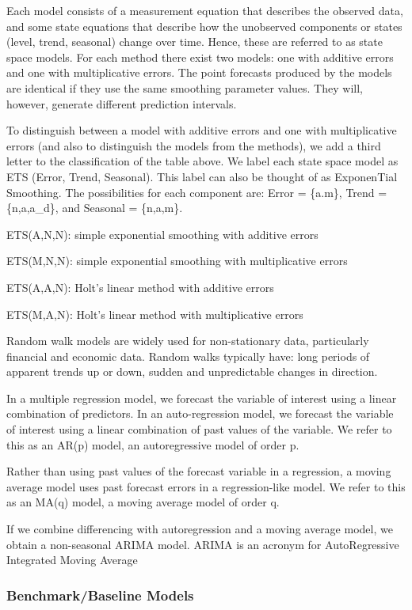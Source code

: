 \documentclass[]{book}
\begin{document}
Each model consists of a measurement equation that describes the observed data, and some state equations that describe how the unobserved components or states (level, trend, seasonal) change over time. Hence, these are referred to as state space models. For each method there exist two models: one with additive errors and one with multiplicative errors. The point forecasts produced by the models are identical if they use the same smoothing parameter values. They will, however, generate different prediction intervals.

To distinguish between a model with additive errors and one with multiplicative errors (and also to distinguish the models from the methods), we add a third letter to the classification of the table above. We label each state space model as ETS (Error, Trend, Seasonal). This label can also be thought of as ExponenTial Smoothing. The possibilities for each component are: Error = \{a.m\}, Trend = \{n,a,a\_d\}, and Seasonal = \{n,a,m\}.

ETS(A,N,N): simple exponential smoothing with additive errors

ETS(M,N,N): simple exponential smoothing with multiplicative errors

ETS(A,A,N): Holt's linear method with additive errors

ETS(M,A,N): Holt's linear method with multiplicative errors

Random walk models are widely used for non-stationary data, particularly financial and economic data. Random walks typically have: long periods of apparent trends up or down, sudden and unpredictable changes in direction.

In a multiple regression model, we forecast the variable of interest using a linear combination of predictors. In an auto-regression model, we forecast the variable of interest using a linear combination of past values of the variable. We refer to this as an AR(p) model, an autoregressive model of order p.

Rather than using past values of the forecast variable in a regression, a moving average model uses past forecast errors in a regression-like model. We refer to this as an MA(q) model, a moving average model of order q.

If we combine differencing with autoregression and a moving average model, we obtain a non-seasonal ARIMA model. ARIMA is an acronym for AutoRegressive Integrated Moving Average

\hypertarget{benchmarkbaseline-models}{%
\subsubsection{Benchmark/Baseline Models}\label{benchmarkbaseline-models}}
\end{document}
